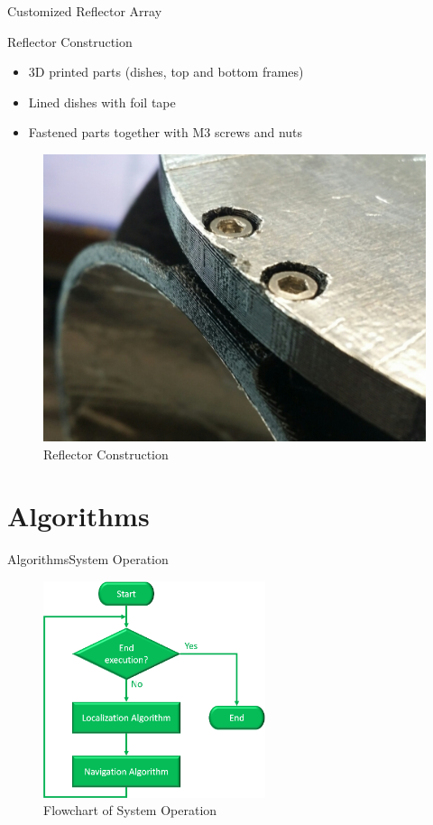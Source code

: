 \documentclass{beamer}
\begin{document}
\begin{frame}{Customized Reflector Array}
  \begin{block}{Reflector Construction}
    \begin{itemize}
      \item 3D printed parts (dishes, top and bottom frames)
      \item Lined dishes with foil tape
      \item Fastened parts together with M3 screws and nuts
    \end{itemize}
  \end{block}
  \begin{figure}
    \centering
    \includegraphics[height=0.5\textheight]{figs/img/reflectorConstruction.jpg}
    \caption{Reflector Construction}
  \end{figure}
\end{frame}


\section{Algorithms}

\begin{frame}{Algorithms}{System Operation}
  \begin{figure}
    \centering
    \includegraphics[height=2.5in]{figs/img/systemOperationFlowchart.png}
    \caption{Flowchart of System Operation}
  \end{figure}
\end{frame}
\end{document}
